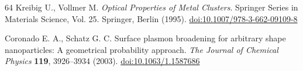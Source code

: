 \begin{thebibliography}{64}
 Kreibig U., Vollmer M. \textit{Optical Properties of Metal Clusters}. Springer Series in Materials Science, Vol. 25. Springer, Berlin (1995). \href{https://doi.org/10.1007/978-3-662-09109-8}{doi:10.1007/978-3-662-09109-8}

 Coronado E. A., Schatz G. C. Surface plasmon broadening for arbitrary shape nanoparticles: A geometrical probability approach. \textit{The Journal of Chemical Physics} \textbf{119}, 3926--3934 (2003). \href{https://doi.org/10.1063/1.1587686}{doi:10.1063/1.1587686}
\end{thebibliography}
